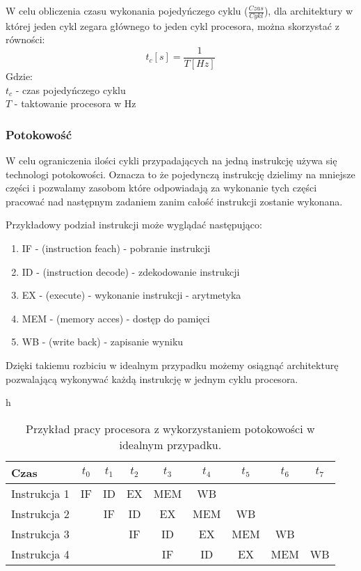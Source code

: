 W celu obliczenia czasu wykonania pojedyńczego cyklu ($\frac{Czas}{Cykl}$), dla architektury w której jeden cykl zegara głównego to jeden cykl procesora, można skorzystać z równości:
\begin{equation}
        \label{Cykli w sec}
        t_c [s]= \frac{1}{T [Hz]}
\end{equation} 
Gdzie:\\
\indent $t_c$ - czas pojedyńczego cyklu \\
\indent $T$ - taktowanie procesora w Hz

\subsubsection{Potokowość}

W celu ograniczenia ilości cykli przypadających na jedną instrukcję używa się technologi potokowości. 
Oznacza to że pojedynczą instrukcję dzielimy na mniejsze części i pozwalamy zasobom które odpowiadają za wykonanie tych części pracować nad następnym zadaniem zanim całość instrukcji zostanie wykonana.

Przykładowy podział instrukcji może wyglądać następująco:
\begin{enumerate}
        \item IF - (instruction feach) - pobranie instrukcji
        \item ID - (instruction decode) -  zdekodowanie instrukcji
        \item EX - (execute) - wykonanie instrukcji - arytmetyka
        \item MEM - (memory acces) - dostęp do pamięci
        \item WB - (write back) - zapisanie wyniku
\end{enumerate}

Dzięki takiemu rozbiciu w idealnym przypadku możemy osiągnąć architekturę pozwalającą wykonywać każdą instrukcję w jednym cyklu procesora. 

\begin{table}{h}
        \centering
        \caption{Przykład pracy procesora z wykorzystaniem potokowości w idealnym przypadku.}
        \label{pipelining}
        \begin{tabular}{lcccccccc}
                Czas & $t_0$&$t_1$&$t_2$&$t_3$&$t_4$&$t_5$&$t_6$&$t_7$ \\ \hline
                Instrukcja 1 & IF & ID & EX & MEM & WB &    & \\
                Instrukcja 2 &    & IF & ID & EX & MEM & WB & \\
                Instrukcja 3 &    &    & IF & ID & EX & MEM & WB \\
                Instrukcja 4 &    &    &    & IF & ID & EX & MEM & WB
        \end{tabular}
\end{table}



